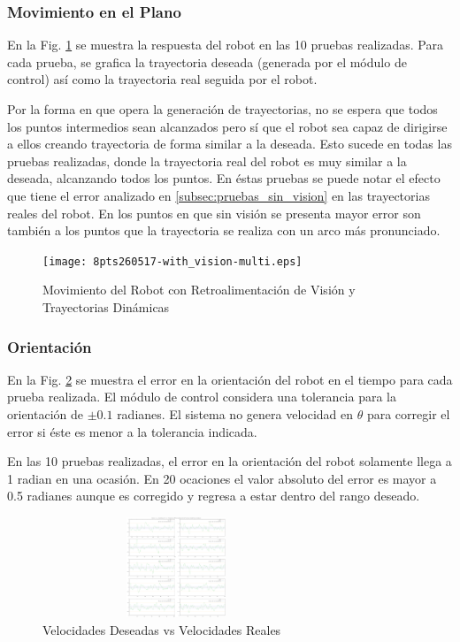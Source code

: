 \documentclass[twocolumn,10pt]{amrob}
\begin{document}
\subsubsection*{Movimiento en el Plano}
En la Fig. \ref{fig:8pts_vision_multi} se muestra la respuesta del robot en las 10 pruebas realizadas. Para cada prueba, se grafica la trayectoria deseada (generada por el módulo de control) así como la trayectoria real seguida por el robot. 
\par
Por la forma en que opera la generación de trayectorias, no se espera que todos los puntos intermedios sean alcanzados pero sí que el robot sea capaz de dirigirse a ellos creando trayectoria de forma similar a la deseada. Esto sucede en todas las pruebas realizadas, donde la trayectoria real del robot es muy similar a la deseada, alcanzando todos los puntos. En éstas pruebas se puede notar el efecto que tiene el error analizado en \ref{subsec:pruebas_sin_vision} en las trayectorias reales del robot. En los puntos en que sin visión se presenta mayor error son también a los puntos que la trayectoria se realiza con un arco más pronunciado. 
\par
\begin{figure}
  \centering
    \texttt{[image: 8pts260517-with\_vision-multi.eps]}
  \caption{Movimiento del Robot con Retroalimentación de Visión y Trayectorias Dinámicas}
  \label{fig:8pts_vision_multi}
\end{figure}
\subsubsection*{Orientación}
En la Fig. \ref{fig:orient_vision_multi} se muestra el error en la orientación del robot en el tiempo para cada prueba realizada. El módulo de control considera una tolerancia para la orientación de $\pm 0.1$ radianes. El sistema no genera velocidad en $\theta$ para corregir el error si éste es menor a la tolerancia indicada. 
\par
En las 10 pruebas realizadas, el error en la orientación del robot solamente llega a 1 radian en una ocasión. En 20 ocaciones el valor absoluto del error es mayor a 0.5 radianes aunque es corregido y regresa a estar dentro del rango deseado. 
\par
\begin{figure}
  \centering
    \includegraphics[height=3cm,width=8cm]{8pts260517-with_vision-multi-theta.eps}
  \caption{Velocidades Deseadas vs Velocidades Reales}
  \label{fig:orient_vision_multi}
\end{figure}
\end{document}
